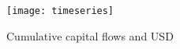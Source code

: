 \documentclass[12pt, a4paper, oneside]{article}\usepackage[]{graphicx}\usepackage[]{color}
\begin{document}


\begin{figure}[h!]
\graphicspath{{/Figures2/}}
\centering
\caption{Cumulative capital flows and USD}
\label{figref:ts}
\texttt{[image: timeseries]}
\end{figure}
\end{document}
